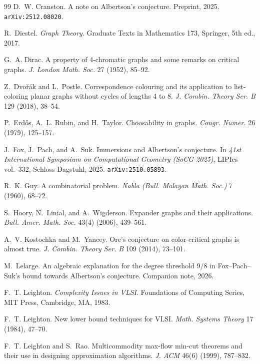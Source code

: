 \documentclass[11pt,a4paper]{article}
\theoremstyle{definition}
\begin{document}
\begin{thebibliography}{99}
D.~W. Cranston.
\newblock A note on Albertson's conjecture.
\newblock Preprint, 2025.
\newblock \texttt{arXiv:2512.08020}.

R.~Diestel.
\newblock \emph{Graph Theory}.
\newblock Graduate Texts in Mathematics 173, Springer, 5th ed., 2017.

G.~A. Dirac.
\newblock A property of 4-chromatic graphs and some remarks on
critical graphs.
\newblock \emph{J. London Math. Soc.} 27 (1952), 85--92.

Z.~Dvo\v{r}\'ak and L.~Postle.
\newblock Correspondence colouring and its application to list-coloring
planar graphs without cycles of lengths 4 to 8.
\newblock \emph{J. Combin. Theory Ser. B} 129 (2018), 38--54.

P.~Erd\H{o}s, A.~L. Rubin, and H.~Taylor.
\newblock Choosability in graphs.
\newblock \emph{Congr. Numer.} 26 (1979), 125--157.

J.~Fox, J.~Pach, and A.~Suk.
\newblock Immersions and Albertson's conjecture.
\newblock In \emph{41st International Symposium on Computational
Geometry (SoCG 2025)}, LIPIcs vol.~332, Schloss Dagstuhl, 2025.
\newblock \texttt{arXiv:2510.05893}.

R.~K. Guy.
\newblock A combinatorial problem.
\newblock \emph{Nabla (Bull. Malayan Math. Soc.)} 7 (1960), 68--72.

S.~Hoory, N.~Linial, and A.~Wigderson.
\newblock Expander graphs and their applications.
\newblock \emph{Bull. Amer. Math. Soc.} 43(4) (2006), 439--561.

A.~V. Kostochka and M.~Yancey.
\newblock Ore's conjecture on color-critical graphs is almost true.
\newblock \emph{J. Combin. Theory Ser. B} 109 (2014), 73--101.

M.~Lelarge.
\newblock An algebraic explanation for the degree threshold $9/8$
in Fox--Pach--Suk's bound towards Albertson's conjecture.
\newblock Companion note, 2026.

F.~T. Leighton.
\newblock \emph{Complexity Issues in VLSI}.
\newblock Foundations of Computing Series, MIT Press, Cambridge,
MA, 1983.

F.~T. Leighton.
\newblock New lower bound techniques for VLSI.
\newblock \emph{Math. Systems Theory} 17 (1984), 47--70.

F.~T. Leighton and S.~Rao.
\newblock Multicommodity max-flow min-cut theorems and their use in
designing approximation algorithms.
\newblock \emph{J. ACM} 46(6) (1999), 787--832.


\end{thebibliography}
\end{document}
